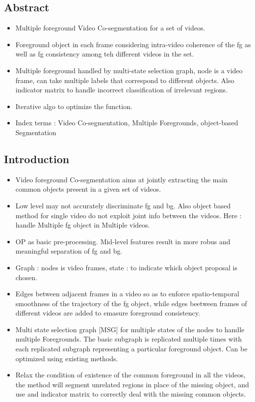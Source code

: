 \documentclass{article}
\begin{document}
\subsection{Abstract}
\begin{itemize}
\item Multiple foreground Video Co-segmentation for a set of videos.
\item Foreground object in each frame considering intra-video coherence of the fg as well as fg consistency among teh different videos in the set.
\item Multiple foreground handled by multi-state selection graph, node is a video frame, can take multiple labels that correspond to different objects. Also indicator matrix to handle incorrect classification of irrelevant regions.
\item Iterative algo to optimize the function.
\item Index terms : Video Co-segmentation, Multiple Foregrounds, object-based Segmentation
\end{itemize}

\subsection{Introduction}
\begin{itemize}
\item Video foreground Co-segmentation aims at jointly extracting the main common objects present in a given set of videos.
\item Low level may not accurately discriminate fg and bg. Also object based method for single video do not exploit joint info between the videos. Here : handle Multiple fg object in Multiple videos.
\item OP as basic pre-processing. Mid-level features result in more robus and meaningful separation of fg and bg.
\item Graph : nodes is video frames, state : to indicate which object proposal is chosen.
\item Edges between adjacent frames in a video so as to enforce spatio-temporal smoothness of the trajectory of the fg object, while edges beetween frames of different videos are added to emasure foreground consistency.
\item Multi state selection graph [MSG] for multiple states of the nodes to handle multiple Foregrounds. The basic subgraph is replicated multiple times with each replicated subgraph representing a particular foreground object. Can be optimized using existing methods.
\item Relax the condition of existence of the common foreground in all the videos, the method will segment unrelated regions in place of the missing object, and use and indicator matrix to correctly deal with the missing common objects.
\end{itemize}
\end{document}
